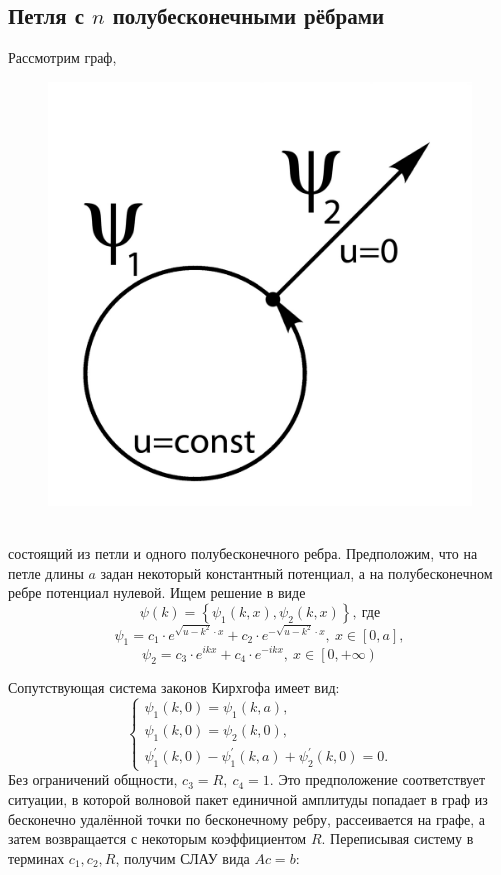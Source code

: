 \documentclass[a4 paper, 12 pt]{extarticle}
\begin{document}
   \subsection{Петля с $n$ полубесконечными рёбрами}
   Рассмотрим граф,
   \begin{figure}[!htb]
   	\centering
   	\includegraphics[scale=0.5]{one-arrow.jpg}
   \end{figure}
   \\состоящий из петли и одного полубесконечного ребра. Предположим, что на петле длины $a$ задан некоторый константный потенциал, а на полубесконечном ребре потенциал нулевой.
   Ищем решение в виде
   \[\psi\left(k\right) = \left\{\psi_1\left(k,x\right), \psi_2\left(k,x\right)\right\}, \ \text{где}\]
   \[
   \psi_1 = c_1\cdot e^{\sqrt{u-k^2} \cdot x} + c_2\cdot e^{-\sqrt{u-k^2} \cdot x}, \ x \in \left[0,a\right],\]
   \[\psi_2 = c_3 \cdot e^{ikx}+c_4 \cdot e^{-ikx}, \ x \in \left[0,+\infty\right)\]
   
   Сопутствующая система законов Кирхгофа имеет вид:
   \[\begin{cases}
   \psi_1\left(k,0\right)=\psi_1\left(k,a\right), \\
   \psi_{1}\left(k,0\right)=\psi_2\left(k,0\right), \\
   \psi_1^\prime\left(k,0\right)-\psi_1^\prime\left(k,a\right)+\psi_2^\prime\left(k,0\right)=0.
   \end{cases}
   \]
   Без ограничений общности, $c_3=R, \ c_4 = 1$. Это предположение соответствует ситуации, в которой волновой пакет единичной амплитуды попадает в граф из бесконечно удалённой точки по бесконечному ребру, рассеивается на графе, а затем возвращается с некоторым коэффициентом $R$. Переписывая систему в терминах $c_1,c_2,R$, получим СЛАУ вида $Ac=b$:
   
\end{document}
